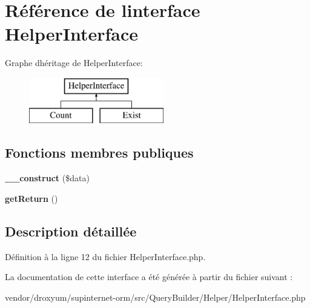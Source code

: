 \hypertarget{interface_o_r_m_1_1_query_builder_1_1_helper_1_1_helper_interface}{}\section{Référence de l\textquotesingle{}interface Helper\+Interface}
\label{interface_o_r_m_1_1_query_builder_1_1_helper_1_1_helper_interface}
Graphe d\textquotesingle{}héritage de Helper\+Interface\+:\begin{figure}[H]
\begin{center}
\leavevmode
\includegraphics[height=2.000000cm]{interface_o_r_m_1_1_query_builder_1_1_helper_1_1_helper_interface}
\end{center}
\end{figure}
\subsection*{Fonctions membres publiques}
\begin{DoxyCompactItemize}
\item 
{\bfseries \+\_\+\+\_\+construct} (\$data)\hypertarget{interface_o_r_m_1_1_query_builder_1_1_helper_1_1_helper_interface_ab452db2d5d284bffa31c9accbaeec836}{}\label{interface_o_r_m_1_1_query_builder_1_1_helper_1_1_helper_interface_ab452db2d5d284bffa31c9accbaeec836}

\item 
{\bfseries get\+Return} ()\hypertarget{interface_o_r_m_1_1_query_builder_1_1_helper_1_1_helper_interface_a76a9e4fbc3017b3eb344ecb084f2c3a9}{}\label{interface_o_r_m_1_1_query_builder_1_1_helper_1_1_helper_interface_a76a9e4fbc3017b3eb344ecb084f2c3a9}

\end{DoxyCompactItemize}


\subsection{Description détaillée}


Définition à la ligne 12 du fichier Helper\+Interface.\+php.



La documentation de cette interface a été générée à partir du fichier suivant \+:\begin{DoxyCompactItemize}
\item 
vendor/droxyum/supinternet-\/orm/src/\+Query\+Builder/\+Helper/Helper\+Interface.\+php\end{DoxyCompactItemize}
